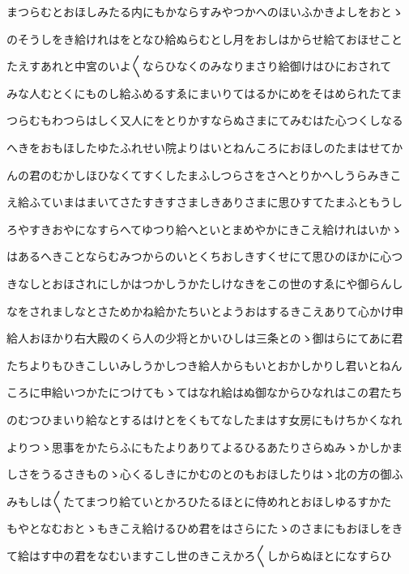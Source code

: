 \documentclass[a4paper,11pt,landscape]{ltjtarticle}
\begin{document}
\par\medskip
まつらむとおほしみたる内にもかならすみやつかへのほいふかきよしをおとゝ
\par\medskip
のそうしをき給けれはをとなひ給ぬらむとし月をおしはからせ給ておほせこと
\par\medskip
たえすあれと中宮のいよ〱ならひなくのみなりまさり給御けはひにおされて
\par\medskip
みな人むとくにものし給ふめるすゑにまいりてはるかにめをそはめられたてま
\par\medskip
つらむもわつらはしく又人にをとりかすならぬさまにてみむはた心つくしなる
\par\medskip
へきをおもほしたゆたふれせい院よりはいとねんころにおほしのたまはせてか
\par\medskip
んの君のむかしほひなくてすくしたまふしつらさをさへとりかへしうらみきこ
\par\medskip
え給ふていまはまいてさたすきすさましきありさまに思ひすてたまふともうし
\par\medskip
ろやすきおやになすらへてゆつり給へといとまめやかにきこえ給けれはいかゝ
\par\medskip
はあるへきことならむみつからのいとくちおしきすくせにて思ひのほかに心つ
\par\medskip
きなしとおほされにしかはつかしうかたしけなきをこの世のすゑにや御らんし
\par\medskip
なをされましなとさためかね給かたちいとようおはするきこえありて心かけ申
\par\medskip
給人おほかり右大殿のくら人の少将とかいひしは三条とのゝ御はらにてあに君
\par\medskip
たちよりもひきこしいみしうかしつき給人からもいとおかしかりし君いとねん
\par\medskip
ころに申給いつかたにつけてもゝてはなれ給はぬ御なからひなれはこの君たち
\par\medskip
のむつひまいり給なとするはけとをくもてなしたまはす女房にもけちかくなれ
\par\medskip
よりつゝ思事をかたらふにもたよりありてよるひるあたりさらぬみゝかしかま
\par\medskip
しさをうるさきものゝ心くるしきにかむのとのもおほしたりはゝ北の方の御ふ
\par\medskip
みもしは〱たてまつり給ていとかろひたるほとに侍めれとおほしゆるすかた
\par\medskip
もやとなむおとゝもきこえ給けるひめ君をはさらにたゝのさまにもおほしをき
\par\medskip
て給はす中の君をなむいますこし世のきこえかろ〱しからぬほとになすらひ
\par\medskip
\end{document}
